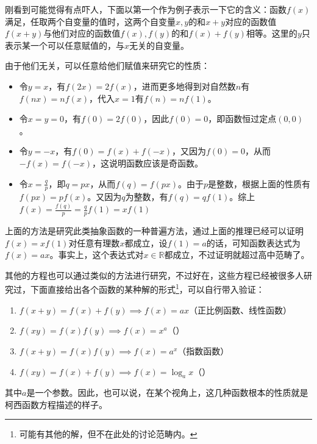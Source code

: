 刚看到可能觉得有点吓人，下面以第一个作为例子表示一下它的含义：函数$f(x)$满足，任取两个自变量的值时，这两个自变量$x,y$的和$x+y$对应的函数值$f(x+y)$与他们对应的函数值$f(x),f(y)$的和$f(x)+f(y)$相等。这里的$y$只表示某一个可以任意赋值的，与$x$无关的自变量。

由于他们无关，可以任意给他们赋值来研究它的性质：
\begin{itemize}
\item 令$y=x$，有$f(2x)=2f(x)$，进而更多地得到对自然数$n$有$f(nx)=nf(x)$，代入$x=1$有$f(n)=nf(1)$。
\item 令$x=y=0$，有$f(0)=2f(0)$，因此$f(0)=0$，即函数恒过定点$(0,0)$。
\item 令$y=-x$，有$f(0)=f(x)+f(-x)$，又因为$f(0)=0$，从而$-f(x)=f(-x)$，这说明函数应该是奇函数。
\item 令$\displaystyle x=\frac{q}{p}$，即$q=px$，从而$f(q)=f(px)$。由于$p$是整数，根据上面的性质有$f(px)=pf(x)$。又因为$q$为整数，有$f(q)=qf(1)$。综上$\displaystyle f(x)=\frac{f(q)}{p}=\frac{q}{p}f(1)=xf(1)$
\end{itemize}

上面的方法是研究此类抽象函数的一种普遍方法，通过上面的推理已经可以证明$f(x)=xf(1)$对任意有理数$x$都成立，设$f(1)=a$的话，可知函数表达式为$f(x)=ax$。事实上，这个表达式对$x\in\mathbb{R}$都成立，不过证明就超过高中范畴了。

其他的方程也可以通过类似的方法进行研究，不过好在，这些方程已经被很多人研究过，下面直接给出各个函数的某种解的形式\footnote{可能有其他的解，但不在此处的讨论范畴内。}，可以自行带入验证：

\begin{enumerate}
\item $f(x+y)=f(x)+f(y)\implies f(x)=ax$（正比例函数、线性函数）
\item $f(xy)=f(x)f(y)\implies f(x)=x^a$（）
\item $f(x+y)=f(x)f(y)\implies f(x)=a^x$（指数函数）
\item $f(xy)=f(x)+f(y)\implies f(x)=\log_ax$（）
\end{enumerate}

其中$a$是一个参数。因此，也可以说，在某个视角上，这几种函数根本的性质就是柯西函数方程描述的样子。
